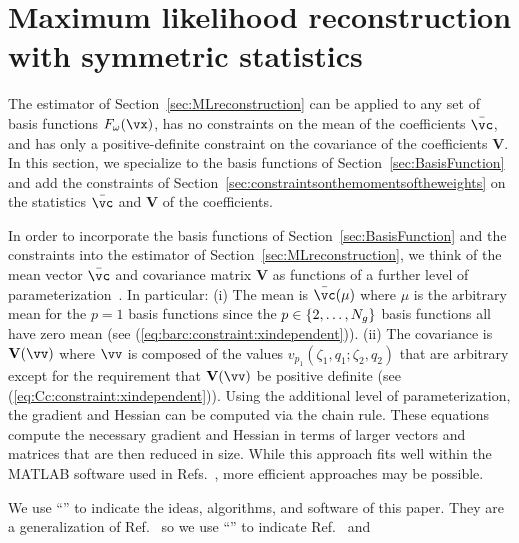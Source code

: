 \section{Maximum likelihood reconstruction with symmetric statistics}
\label{sec:MLE}
The estimator of Section~\ref{sec:MLreconstruction} can be
applied to any set of basis functions $F_\omega(\vx)$, has no constraints
on the mean of the coefficients $\bar{\vc}$, and has only a
positive-definite constraint on the covariance of the coefficients
$\mathbf{V}$.
In this section, we specialize to the basis functions of
Section~\ref{sec:BasisFunction} and add the constraints of
Section~\ref{sec:constraintsonthemomentsoftheweights} on the statistics
$\bar{\vc}$ and $\mathbf{V}$ of the coefficients.
\par
In order to incorporate the basis functions of
Section~\ref{sec:BasisFunction} and the constraints into the estimator of
Section~\ref{sec:MLreconstruction},
we think of the mean vector $\bar{\vc}$ and covariance matrix $\mathbf{V}$
as functions of a further level of
parameterization~\cite{XuDoerschukEMBC2016}.
In particular:
(i) The mean is $\bar{\vc}(\mu)$ where $\mu$ is the arbitrary mean for the
$p=1$ basis functions since the $p\in\{2,\dots,N_g\}$ basis functions
all have zero mean (see (\ref{eq:barc:constraint:xindependent})). %
(ii) The covariance is $\mathbf{V}(\vv)$ where $\vv$ is composed of the values
$v_{p_1}(\zeta_1,q_1;\zeta_2,q_2)$ that are arbitrary except for the
requirement that $\mathbf{V}(\vv)$ be positive definite
(see (\ref{eq:Cc:constraint:xindependent})). %
Using the additional level of parameterization, the gradient and Hessian
can be computed via the chain rule.
These equations compute the necessary gradient and Hessian in terms of
larger vectors and matrices that are then reduced in size.
While this approach fits well within the MATLAB software used in
Refs.~\cite{YiliZhengQiuWangDoerschukJOSA2012,QiuWangMatsuiDomitrovicYiliZhengDoerschukJohnsonJSB2012,TangKearneyQiuWangDoerschukBakerJohnsonJMolRecog2014,DomitrovicMovahedBothnerMatsuiQiuWangDoerschukJohnsonJMB2013,YunyeGongVeeslerDoerschukJohnsonJSB2016,DoerschukGongXuDomitrovicJohnsonCurOpinVirology2016},
more efficient approaches may be possible.
\par
We use ``\hetero'' to indicate the ideas, algorithms, and software of this
paper.
They are a generalization of Ref.~\cite{YiliZhengQiuWangDoerschukJOSA2012}
so we use ``{\heterosymparticles}'' to indicate
Ref.~\cite{YiliZhengQiuWangDoerschukJOSA2012} and
